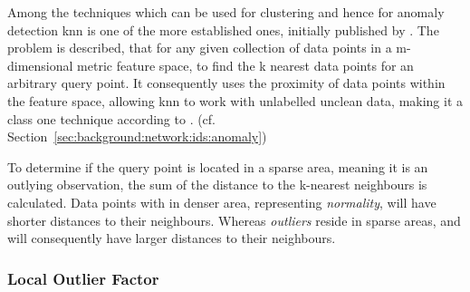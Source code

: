 Among the techniques which can be used for clustering and hence for anomaly detection \gls{knn} is one of the more established ones, initially published by \textcite{Fix1951}.
The problem is described, that for any given collection of data points in a m-dimensional metric feature space, to find the k nearest data points for an arbitrary query point. \parencite{Beyer1999}
It consequently uses the proximity of data points within the feature space, allowing \gls{knn} to work with unlabelled unclean data, making it a class one technique according to \textcite{Hodge2004}. (cf. Section~\ref{sec:background:network:ids:anomaly})

To determine if the query point is located in a sparse area, meaning it is an outlying observation, the sum of the distance to the k-nearest neighbours is calculated.
Data points with in denser area, representing \emph{normality}, will have shorter distances to their neighbours. 
Whereas \emph{outliers} reside in sparse areas, and will consequently have larger distances to their neighbours. \parencite{Eskin2002}

\subsubsection{Local Outlier Factor}
\label{sec:background:network:novelty:lof}

